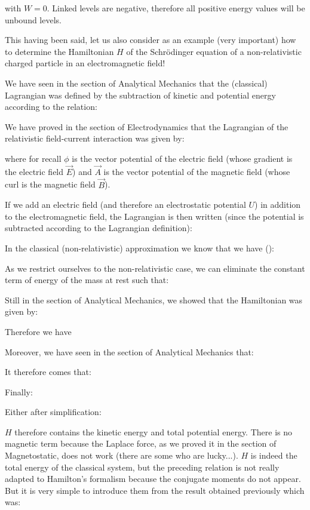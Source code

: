 	with $W=0$. Linked levels are negative, therefore all positive energy values will be unbound levels.
	
	This having been said, let us also consider as an example (very important) how to determine the Hamiltonian $H$ of the Schrödinger equation of a non-relativistic charged particle in an electromagnetic field!

	We have seen in the section of Analytical Mechanics that the (classical) Lagrangian was defined by the subtraction of kinetic and potential energy according to the relation:
	
	We have proved in the section of Electrodynamics that the Lagrangian of the relativistic field-current interaction was given by:
	
	where for recall $\phi$ is the vector potential of the electric field (whose gradient is the electric field $\vec{E}$) and $\vec{A}$ is the vector potential of the magnetic field (whose curl is the magnetic field $\vec{B}$).

	If we add an electric field (and therefore an electrostatic potential $U$) in addition to the electromagnetic field, the Lagrangian is then written (since the potential is subtracted according to the Lagrangian definition):
	
	In the classical (non-relativistic) approximation we know that we have ():
	
	As we restrict ourselves to the non-relativistic case, we can eliminate the constant term of energy of the mass at rest such that:
	
	Still in the section of Analytical Mechanics, we showed that the Hamiltonian was given by:
	
	Therefore we have
	
	Moreover, we have seen in the section of Analytical Mechanics that:
	
	It therefore comes that:
	
	Finally:
	
	Either after simplification:
	
	$H$ therefore contains the kinetic energy and total potential energy. There is no magnetic term because the Laplace force, as we proved it in the section of Magnetostatic, does not work (there are some who are lucky...). $H$ is indeed the total energy of the classical system, but the preceding relation is not really adapted to Hamilton's formalism because the conjugate moments do not appear. But it is very simple to introduce them from the result obtained previously which was:
	
